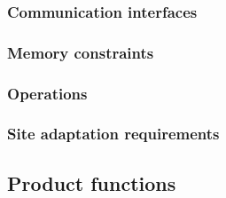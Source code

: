 \subsubsection{Communication interfaces}


\subsubsection{Memory constraints}


\subsubsection{Operations}


\subsubsection{Site adaptation requirements}


\subsection{Product functions}


